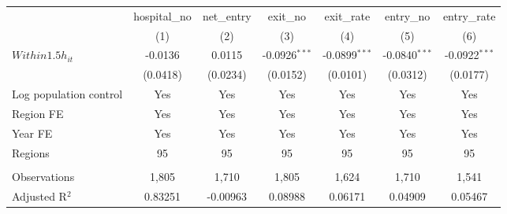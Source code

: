 \begingroup
\centering
\begin{tabular}{lcccccc}
   \toprule
                          & hospital\_no  & net\_entry  & exit\_no        & exit\_rate      & entry\_no       & entry\_rate \\    
                          & (1)           & (2)         & (3)             & (4)             & (5)             & (6)\\  
   \midrule 
   $Within1.5h_{it}$      & -0.0136       & 0.0115      & -0.0926$^{***}$ & -0.0899$^{***}$ & -0.0840$^{***}$ & -0.0922$^{***}$\\   
                          & (0.0418)      & (0.0234)    & (0.0152)        & (0.0101)        & (0.0312)        & (0.0177)\\   
   Log population control & Yes           & Yes         & Yes             & Yes             & Yes             & Yes\\  
   Region FE              & Yes           & Yes         & Yes             & Yes             & Yes             & Yes\\  
   Year FE                & Yes           & Yes         & Yes             & Yes             & Yes             & Yes\\  
   Regions                & 95            & 95          & 95              & 95              & 95              & 95\\  
    \\
   Observations           & 1,805         & 1,710       & 1,805           & 1,624           & 1,710           & 1,541\\  
   Adjusted R$^2$         & 0.83251       & -0.00963    & 0.08988         & 0.06171         & 0.04909         & 0.05467\\  
   \bottomrule
\end{tabular}
\par\endgroup

